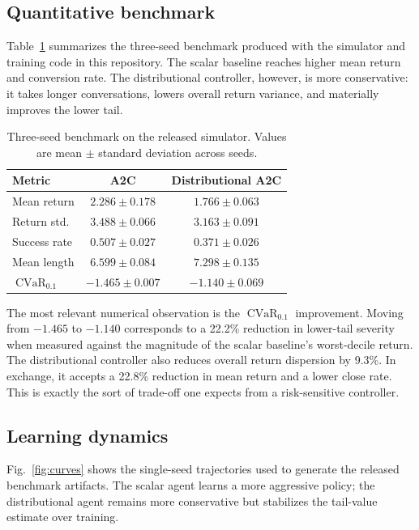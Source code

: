 \documentclass[conference]{IEEEtran}
\newcommand{\cvar}{\operatorname{CVaR}}
\begin{document}
\subsection{Quantitative benchmark}
Table~\ref{tab:results} summarizes the three-seed benchmark produced with the simulator and training code in this repository. The scalar baseline reaches higher mean return and conversion rate. The distributional controller, however, is more conservative: it takes longer conversations, lowers overall return variance, and materially improves the lower tail.

\begin{table}[t]
\centering
\caption{Three-seed benchmark on the released simulator. Values are mean \(\pm\) standard deviation across seeds.}
\label{tab:results}
\begin{tabular}{lcc}
\toprule
\textbf{Metric} & \textbf{A2C} & \textbf{Distributional A2C} \\
\midrule
Mean return & \(2.286 \pm 0.178\) & \(1.766 \pm 0.063\) \\
Return std. & \(3.488 \pm 0.066\) & \(\mathbf{3.163 \pm 0.091}\) \\
Success rate & \(\mathbf{0.507 \pm 0.027}\) & \(0.371 \pm 0.026\) \\
Mean length & \(6.599 \pm 0.084\) & \(\mathbf{7.298 \pm 0.135}\) \\
\(\cvar_{0.1}\) & \(-1.465 \pm 0.007\) & \(\mathbf{-1.140 \pm 0.069}\) \\
\bottomrule
\end{tabular}
\end{table}

The most relevant numerical observation is the \(\cvar_{0.1}\) improvement. Moving from \(-1.465\) to \(-1.140\) corresponds to a 22.2\% reduction in lower-tail severity when measured against the magnitude of the scalar baseline's worst-decile return. The distributional controller also reduces overall return dispersion by 9.3\%. In exchange, it accepts a 22.8\% reduction in mean return and a lower close rate. This is exactly the sort of trade-off one expects from a risk-sensitive controller.

\subsection{Learning dynamics}
Fig.~\ref{fig:curves} shows the single-seed trajectories used to generate the released benchmark artifacts. The scalar agent learns a more aggressive policy; the distributional agent remains more conservative but stabilizes the tail-value estimate over training.
\end{document}
